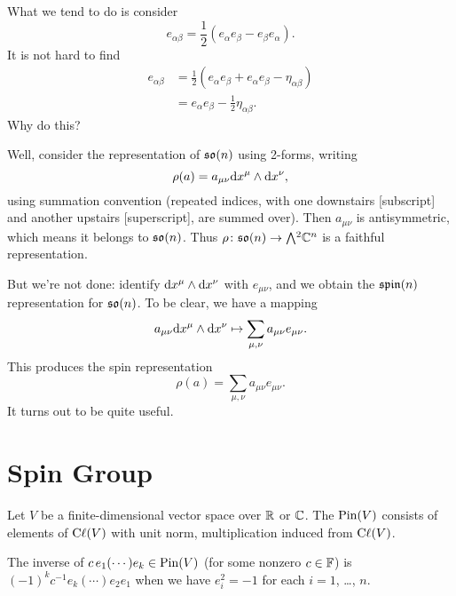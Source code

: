 \M
What we tend to do is consider
\begin{equation}
e_{\alpha\beta} = \frac{1}{2}(e_{\alpha}e_{\beta} - e_{\beta}e_{\alpha}).
\end{equation}
It is not hard to find
\begin{equation}
\begin{split}
e_{\alpha\beta} &= \frac{1}{2}(e_{\alpha}e_{\beta} + e_{\alpha}e_{\beta} - \eta_{\alpha\beta})\\
&= e_{\alpha}e_{\beta} - \frac{1}{2}\eta_{\alpha\beta}.
\end{split}
\end{equation}
Why do this?

Well, consider the representation of $\mathfrak{so}(n)$ using 2-forms, writing
\begin{equation}
\rho(a) = a_{\mu\nu}\mathrm{d} x^{\mu}\wedge\mathrm{d} x^{\nu},
\end{equation}
using summation convention (repeated indices, with one downstairs
[subscript] and another upstairs [superscript], are summed over). Then
$a_{\mu\nu}$ is antisymmetric, which means it belongs to $\mathfrak{so}(n)$. Thus
$\rho\colon\so(n)\to\Exterior^{2}\CC^{n}$ is a faithful representation.

But we're not done: identify $\mathrm{d} x^{\mu}\wedge\mathrm{d} x^{\nu}$ with
$e_{\mu\nu}$, and we obtain the $\operatorname{\mathfrak{spin}}(n)$ representation for $\mathfrak{so}(n)$.
To be clear, we have a mapping
\begin{equation}
a_{\mu\nu}\mathrm{d} x^{\mu}\wedge\mathrm{d} x^{\nu}\mapsto\sum_{\mu,\nu}a_{\mu\nu}e_{\mu\nu}.
\end{equation}
This produces the spin representation
\begin{equation}
\rho(a) = \sum_{\mu,\nu}a_{\mu\nu}e_{\mu\nu}.
\end{equation}
It turns out to be quite useful.

\section{Spin Group}

\begin{definition}
Let $V$ be a finite-dimensional vector space over $\mathbb{R}$ or $\mathbb{C}$.
The  $\operatorname{Pin}(V)$ consists of elements of $\mathrm{C}\ell(V)$
with unit norm, multiplication induced from $\mathrm{C}\ell(V)$.
\end{definition}

\M
The inverse of $c\, e_{1}(\cdots)e_{k}\in\operatorname{Pin}(V)$ (for some nonzero $c\in\mathbb{F}$)
is $(-1)^{k}c^{-1}e_{k}(\cdots)e_{2}e_{1}$ when we have $e_{i}^{2}=-1$
for each $i=1$, \dots, $n$.


